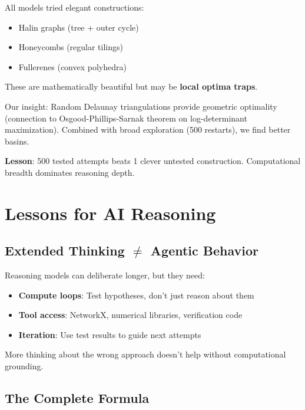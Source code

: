 \documentclass[11pt]{article}
\begin{document}
All models tried elegant constructions:
\begin{itemize}
\item Halin graphs (tree + outer cycle)
\item Honeycombs (regular tilings)
\item Fullerenes (convex polyhedra)
\end{itemize}

These are mathematically beautiful but may be \textbf{local optima traps}.

Our insight: Random Delaunay triangulations provide geometric optimality (connection to Osgood-Phillips-Sarnak theorem on log-determinant maximization). Combined with broad exploration (500 restarts), we find better basins.

\textbf{Lesson}: 500 tested attempts beats 1 clever untested construction. Computational breadth dominates reasoning depth.

\section{Lessons for AI Reasoning}

\subsection{Extended Thinking $\neq$ Agentic Behavior}

Reasoning models can deliberate longer, but they need:
\begin{itemize}
\item \textbf{Compute loops}: Test hypotheses, don't just reason about them
\item \textbf{Tool access}: NetworkX, numerical libraries, verification code
\item \textbf{Iteration}: Use test results to guide next attempts
\end{itemize}

More thinking about the wrong approach doesn't help without computational grounding.

\subsection{The Complete Formula}
\end{document}
